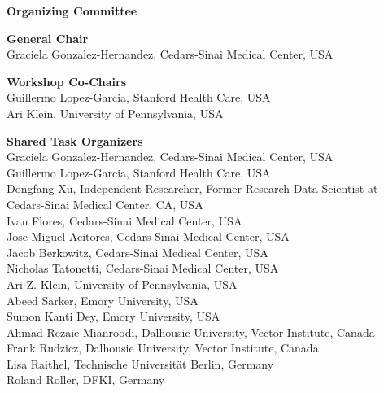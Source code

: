 \documentclass[11pt,oneside]{book}
\begin{document}
{}
\begin{center}
{\Large \textbf{Organizing Committee}}
\end{center}
\vspace*{1cm}
\begin{description}
  \item{\bf General Chair}\vspace{2mm}\\
      Graciela Gonzalez-Hernandez, Cedars-Sinai Medical Center, USA\\
    \item{\bf Workshop Co-Chairs}\vspace{2mm}\\
      Guillermo Lopez-Garcia, Stanford Health Care, USA\\
      Ari Klein, University of Pennsylvania, USA\\
    \item{\bf Shared Task Organizers}\vspace{2mm}\\
      Graciela Gonzalez-Hernandez, Cedars-Sinai Medical Center, USA\\
      Guillermo Lopez-Garcia, Stanford Health Care, USA\\
      Dongfang Xu, Independent Researcher, Former Research Data Scientist at Cedars-Sinai Medical Center, CA, USA\\
      Ivan Flores, Cedars-Sinai Medical Center, USA\\
      Jose Miguel Acitores, Cedars-Sinai Medical Center, USA\\
      Jacob Berkowitz, Cedars-Sinai Medical Center, USA\\
      Nicholas Tatonetti, Cedars-Sinai Medical Center, USA\\
      Ari Z. Klein, University of Pennsylvania, USA\\
      Abeed Sarker, Emory University, USA\\
      Sumon Kanti Dey, Emory University, USA\\
      Ahmad Rezaie Mianroodi, Dalhousie University, Vector Institute, Canada\\
      Frank Rudzicz, Dalhousie University, Vector Institute, Canada\\
      Lisa Raithel, Technische Universität Berlin, Germany\\
      Roland Roller, DFKI, Germany\\

\end{description}
\end{document}

